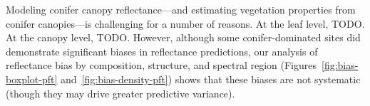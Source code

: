 Modeling conifer canopy reflectance---and estimating vegetation properties from conifer canopies---is challenging for a number of reasons.
At the leaf level, TODO.
At the canopy level, TODO.
However, although some conifer-dominated sites did demonstrate significant biases in reflectance predictions, our analysis of reflectance bias by composition, structure, and spectral region (Figures~\ref{fig:bias-boxplot-pft} and~\ref{fig:bias-density-pft}) shows that these biases are not systematic (though they may drive greater predictive variance).
